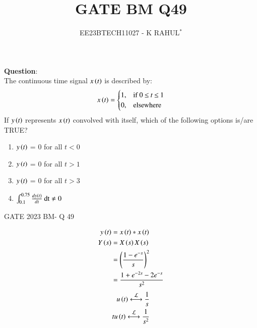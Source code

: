 \documentclass[journal,12pt,twocolumn]{IEEEtran}
\theoremstyle{remark}
\begin{document}

\vspace{3cm}
\title{GATE BM Q49}
\author{EE23BTECH11027 - K RAHUL$^{*}$%
}
\maketitle
\newpage
\bigskip
\renewcommand{\thefigure}{\theenumi}
\renewcommand{\thetable}{\theenumi}
\textbf{Question}:\\
The continuous time signal $x\left(t\right)$ is described by:
\begin{align}
x\left(t\right)=
    \begin{cases}
        1, & \text{if } 0\: {\displaystyle \leq }\:t\:{\displaystyle \leq }\:1\\
        0, & \text{elsewhere}
    \end{cases} 
\end{align}
If $y\left(t\right)$ represents $x\left(t\right)$ convolved with itself, which of the following options is/are TRUE?
\begin{enumerate}[label = (\Alph*)]
    \item $y\left(t\right)$ = 0 for all $t<0$\\
    \item $y\left(t\right)$ = 0 for all $t>1$\\
    \item $y\left(t\right)$ = 0 for all $t>3$\\
    \item $\int_{0.1}^{0.75} \frac{dy\left(t\right)}{dt}\: \text{dt} \neq 0$
\end{enumerate} \hfill{GATE 2023 BM- Q 49}\\
\bigskip 
\bigskip
\solution
\begin{table}[ht]

\end{table}
\bigskip
\begin{align}
    y\left(t\right) &= x\left(t\right) * x\left(t\right)\\
    Y\left(s\right) &= X\left(s\right)X\left(s\right)\\
    &=\left(\frac{1-e^{-s}}{s}\right)^2\\
    &=\frac{1+e^{-2s}-2e^{-s}}{s^2}
\end{align}
\begin{align}
u\brak{t} \system{L} \frac{1}{s}\\
tu\brak{t} \system{L} \frac{1}{s^2} \label{11027_lap_1}
\end{align}
	
\end{document}
